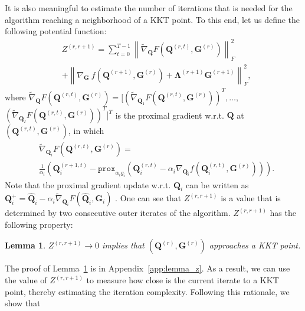 \documentclass[10pt,journal]{IEEEtran}
\newtheorem{Lemma}{Lemma}
\newcommand{\G}{\boldsymbol{G}}
\newcommand{\Q}{\boldsymbol{Q}}
\begin{document}
It is also meaningful to estimate the number of iterations that is needed for the algorithm reaching a neighborhood of a KKT point.
To this end, let us define the following potential function:
\begin{align*}
&Z^{(r,r+1)}=\sum_{t=0}^{T-1}\left\|\tilde{\nabla}_{\Q} F\left(\Q^{(r,t)},\G^{(r)}\right)\right\|_F^2\\
                                                   &+ \left\| \nabla_{\G}~f\left(\Q^{(r+1)},\G^{(r)}\right) + {\bm \Lambda}^{(r+1)}\G^{(r+1)} \right\|_F^2,
\end{align*}
where $\tilde{\nabla}_{\Q} F(\Q^{(r,t)},\G^{(r)})=[(\tilde{\nabla}_{\Q_1} F(\Q^{(r,t)},\G^{(r)}))^T,$$ \ldots,$ $(\tilde{\nabla}_{\Q_I} F(\Q^{(r,t)},\G^{(r)}))^T]^T$
is the proximal gradient w.r.t. $\Q$ at $(\Q^{(r,t)},\G^{(r)})$, in which
\begin{align*}
&\tilde{\nabla}_{\Q_i} F(\Q^{(r,t)},\G^{(r)})=\\
&\frac{1}{\alpha_i}\left(\Q_i^{(r+1,t)} - \texttt{prox}_{\alpha_ig_i}(\Q_i^{(r,t)}-\alpha_i\nabla_{\Q_i} f(\Q_i^{(r,t)},\G^{(r)}))\right). 
\end{align*}
Note that the proximal gradient update w.r.t. $\Q_i$ can be written as
$\Q_i^{+}=\hat{\Q}_i-\alpha_i \tilde{\nabla}_{\Q_i}F(\hat{\Q}_i,\G_i)$ \cite{parikh2013proximal}.
One can see that $Z^{(r,r+1)}$ is a value that is determined by two consecutive outer iterates of the algorithm.
$Z^{(r,r+1)}$ has the following property:
\begin{Lemma}\label{lem:z}
$Z^{(r,r+1)}\rightarrow 0$ implies that $(\Q^{(r)},\G^{(r)})$ approaches a KKT point.
\end{Lemma}
The proof of Lemma~\ref{lem:z} is in Appendix~\ref{app:lemma_z}.
As a result, we can use the value of $Z^{(r,r+1)}$
to measure how close is the current iterate to a KKT point, thereby estimating the iteration complexity.
Following this rationale, we show that
\end{document}
